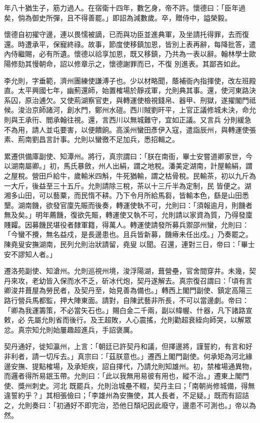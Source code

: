 \begin{pinyinscope}
 年八十猶生子，筋力過人。在宿衛十四年，數乞身，帝不許。懷德曰：「臣年過矣，倘為御史所彈，且不得善罷。」即詔為減數歲。卒，贈侍中，謚榮毅。



 懷德自初擢守邊，連以畏懦被謫，已而與功臣並進典軍，及坐請托得罪，去而復還。時遭承平，保寵終祿。故事，節度使移鎮加恩，皆別上表再辭，每降批答，遣內侍繼賜，必有所遺。懷德以祫享加恩，既又移鎮，乃共為一表以辭。翰林學士歐陽修劾其慢朝命，詔以修章示之，懷德謝罪而已，不復
 別進表。其鄙吝如此。



 李允則，字垂範，濟州團練使謙溥子也。少以材略聞，蔭補衙內指揮使，改左班殿直。太平興國七年，幽薊還師，始置榷場於靜戎軍，允則典其事。還，使河東路決系囚，原治逋欠。又使荊湖察官吏，與轉運使檢視錢帛、器甲、刑獄，遂擢閣門祗候。浚治京師諸河，創水門，鄭州水磑。西川賊劉旰平，上官正議修城未決，命允則與王承衎、閻承翰往視。還，言西川以無城難守，宜如正議。又言兵
 分則緩急不為用，請人並屯要害，以便饋餉。高溪州蠻田彥伊入寇，遣詣辰州，與轉運使張素、荊南劉昌言計事。允則以蠻徼不足加兵，悉招輯之。



 累遷供備庫副使、知潭州。將行，真宗謂曰：「朕在南衙，畢士安嘗道卿家世，今以湖南屬卿。」初，馬氏暴斂，州人出絹，謂之地稅。潘美定湖南，計屋輸絹，謂之屋稅。營田戶給牛，歲輸米四斛，牛死猶輸，謂之枯骨稅。民輸茶，初以九斤為一大斤，後益至三十五斤。允則請除三稅，茶以十三斤半為定制，民
 皆便之。湖湘多山田，可以藝粟，而民惰不耕。乃下令月所給馬芻，皆輸本色，繇是山田悉墾。湖南饑，欲發官廩先賑而後奏，轉運使執不可，允則曰：「須報逾月，則饑者無及矣。」明年薦饑，復欲先賑，轉運使又執不可，允則請以家資為質，乃得發廩賤糶。因募饑民堪役者隸軍籍，得萬人。轉運使請發所募兵禦邵州蠻，允則曰：「今蠻不攪，無名益戍，是長邊患也。且兵皆新募，饑瘠未任出戍。」乃奏罷之。陳堯叟安撫湖南，民列允則治狀請留，堯叟
 以聞。召還，連對三日，帝曰：「畢士安不謬知人者。」



 遷洛苑副使、知滄州。允則巡視州境，浚浮陽湖，葺營壘，官舍間穿井。未幾，契丹來攻，老幼皆入保而水不乏，斫冰代炮，契丹遂解去。真宗復召謂曰：「頃有言卿浚井葺屋為勞民者，及契丹至，始見善為備也。」轉西上閣門副使、鎮定高陽三路行營兵馬都監，押大陣東面。請對，自陳武藝非所長，不可以當邊劇。帝曰：「卿為我運籌策，不必當矢石也。」賜白金二千兩，副以幃幄、什器，凡下諸路宣敕，必
 先屬允則省而後行。及王超敗，人心震搖，允則勸超衰絰向師哭，以解眾忿。真宗知允則始屢趣超進兵，手詔褒厲。



 契丹通好，徙知瀛州，上言：「朝廷已許契丹和議，但擇邊將，謹誓約，有言和好非利者，請一切斥去。」真宗曰：「茲朕意也。」遷西上閣門副使。何承矩為河北緣邊安撫、提點榷場，及承矩疾，詔自擇代，乃請允則知雄州。初，禁榷場通異物，而邏者得所易鈱玉帶。允則曰：「此以我無用易彼有用也，縱不治。」遷東上閣門使、獎州刺史。河北
 既罷兵，允則治城壘不輟，契丹主曰；「南朝尚修城備，得無違誓約乎？」其相張儉曰；「李雄州為安撫使，其人長者，不足疑。」既而有詔詰之，允則奏曰：「初通好不即完治，恐他日頹圮因此廢守，邊患不可測也。」帝以為然。




\end{pinyinscope}
